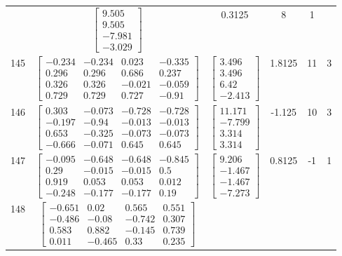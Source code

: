 \documentclass[a4paper,12pt]{article}
\begin{document}
\begin{tabular}{c c c c c c}
&
$\begin{bmatrix} 9.505 \\ 9.505 \\ -7.981 \\ -3.029 \end{bmatrix}$
&
0.3125
&
8
&
1
\\
145
&
$\begin{bmatrix} -0.234 & -0.234 & 0.023 & -0.335 \\ 0.296 & 0.296 & 0.686 & 0.237 \\ 0.326 & 0.326 & -0.021 & -0.059 \\ 0.729 & 0.729 & 0.727 & -0.91 \end{bmatrix}$
&
$\begin{bmatrix} 3.496 \\ 3.496 \\ 6.42 \\ -2.413 \end{bmatrix}$
&
1.8125
&
11
&
3
\\
146
&
$\begin{bmatrix} 0.303 & -0.073 & -0.728 & -0.728 \\ -0.197 & -0.94 & -0.013 & -0.013 \\ 0.653 & -0.325 & -0.073 & -0.073 \\ -0.666 & -0.071 & 0.645 & 0.645 \end{bmatrix}$
&
$\begin{bmatrix} 11.171 \\ -7.799 \\ 3.314 \\ 3.314 \end{bmatrix}$
&
-1.125
&
10
&
3
\\
147
&
$\begin{bmatrix} -0.095 & -0.648 & -0.648 & -0.845 \\ 0.29 & -0.015 & -0.015 & 0.5 \\ 0.919 & 0.053 & 0.053 & 0.012 \\ -0.248 & -0.177 & -0.177 & 0.19 \end{bmatrix}$
&
$\begin{bmatrix} 9.206 \\ -1.467 \\ -1.467 \\ -7.273 \end{bmatrix}$
&
0.8125
&
-1
&
1
\\
148
&
$\begin{bmatrix} -0.651 & 0.02 & 0.565 & 0.551 \\ -0.486 & -0.08 & -0.742 & 0.307 \\ 0.583 & 0.882 & -0.145 & 0.739 \\ 0.011 & -0.465 & 0.33 & 0.235 \end{bmatrix}$

\end{tabular}
\end{document}
